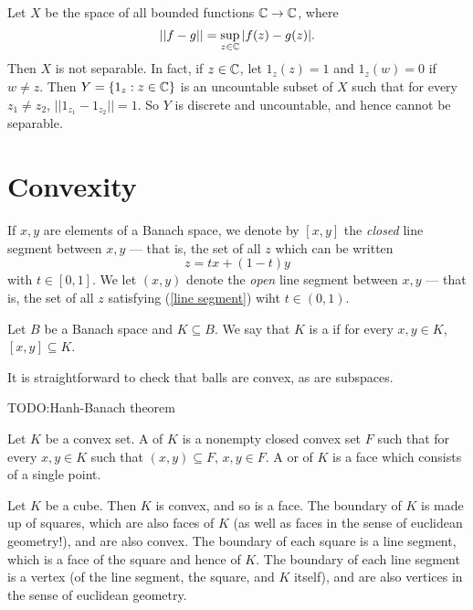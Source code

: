 \begin{example}\label{nonseparable space}
Let $X$ be the space of all bounded functions $\mathbb{C} \to \mathbb{C}$, where
\[||f - g|| = \sup_{z \in \mathbb{C}}|f(z) - g(z)|.\]
Then $X$ is not separable. In fact, if $z \in \mathbb{C}$, let $1_{z}(z) = 1$ and $1_{z}(w) = 0$ if $w \neq z$.
Then $Y=\{1_{z}: z \in \mathbb{C}\}$ is an uncountable subset of $X$ such that for every $z_{1} \neq z_{2}$, $||1_{z_{1}} - 1_{z_{2}}|| =1$.
So $Y$ is discrete and uncountable, and hence cannot be separable.
\end{example}

\section{Convexity}
\begin{subsec}
If $x, y$ are elements of a Banach space, we denote by $[x, y]$ the \emph{closed} line segment between $x, y$ --- that is, the set of all $z$ which can be written
\begin{equation}\label{line segment}
z = tx + (1 - t)y
\end{equation}
with $t \in [0, 1]$.
We let $(x, y)$ denote the \emph{open} line segment between $x, y$ --- that is, the set of all $z$ satisfying (\ref{line segment}) wiht $t \in (0, 1)$.
\end{subsec}

\begin{definition}
Let $B$ be a Banach space and $K \subseteq B$. We say that $K$ is a  if for every $x, y \in K$, $[x, y] \subseteq K$.
\end{definition}

\begin{subsec}
It is straightforward to check that balls are convex, as are subspaces.
\end{subsec}

TODO:\@ Hanh-Banach theorem

\begin{definition}
Let $K$ be a convex set. A  of $K$ is a nonempty closed convex set $F$ such that for every $x,y \in K$ such that $(x, y) \subseteq F$, $x, y \in F$.
A  or  of $K$ is a face which consists of a single point.
\end{definition}

\begin{example}\label{cube is convex}
Let $K$ be a cube. Then $K$ is convex, and so is a face. The boundary of $K$ is made up of squares, which are also faces of $K$ (as well as faces in the sense of euclidean geometry!), and are also convex. The boundary of each square is a line segment, which is a face of the square and hence of $K$. The boundary of each line segment is a vertex (of the line segment, the square, and $K$ itself), and are also vertices in the sense of euclidean geometry.
\end{example}

